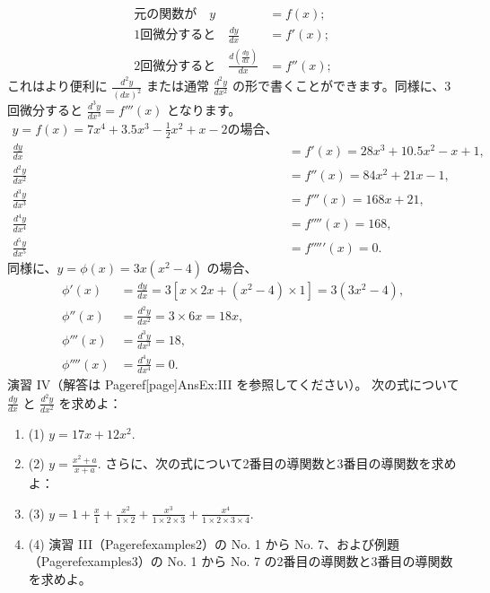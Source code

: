 \documentclass[a4paper,11pt,openany]{ltjsbook}
\begin{document}
\begin{align*}
\text{元の関数が} \quad y &= f(x);  \\
\text{1回微分すると} \quad \frac{dy}{dx} &= f'(x); \\
\text{2回微分すると} \quad \frac{d\left(\frac{dy}{dx}\right)}{dx} &= f''(x);
\end{align*}
これはより便利に $\frac{d^2y}{(dx)^2}$ または通常 $\frac{d^2y}{dx^2}$ の形で書くことができます。同様に、3回微分すると $\frac{d^3y}{dx^3} = f'''(x)$ となります。
\begin{align*}
y = f(x) = 7x^4 + 3.5x^3 - \frac{1}{2}x^2 + x - 2 の場合、 \\
\frac{dy}{dx} &= f'(x) = 28x^3 + 10.5x^2 - x + 1, \\
\frac{d^2y}{dx^2} &= f''(x) = 84x^2 + 21x - 1, \\
\frac{d^3y}{dx^3} &= f'''(x) = 168x + 21, \\
\frac{d^4y}{dx^4} &= f''''(x) = 168, \\
\frac{d^5y}{dx^5} &= f'''''(x) = 0.
\end{align*}
同様に、$y = \phi(x) = 3x(x^2 - 4)$ の場合、
\begin{align*}
\phi'(x) &= \frac{dy}{dx} = 3[x \times  2x + (x^2 - 4) \times  1] = 3(3x^2 - 4), \\
\phi''(x) &= \frac{d^2y}{dx^2} = 3 \times  6x = 18x, \\
\phi'''(x) &= \frac{d^3y}{dx^3} = 18, \\
\phi''''(x) &= \frac{d^4y}{dx^4} = 0.
\end{align*}
演習 IV（解答は Pageref[page]{AnsEx:III} を参照してください）。
次の式について $\frac{dy}{dx}$ と $\frac{d^2y}{dx^2}$ を求めよ：
\begin{enumerate}
\item (1) $y = 17x + 12x^2$.
\item (2) $y = \frac{x^2 + a}{x + a}$.
さらに、次の式について2番目の導関数と3番目の導関数を求めよ：
\item (3) $y = 1 + \frac{x}{1} + \frac{x^2}{1\times 2} + \frac{x^3}{1\times 2\times 3} + \frac{x^4}{1\times 2\times 3\times 4}$.
\item (4) 演習 III（Pageref{examples2}）の No. 1 から No. 7、および例題（Pageref{examples3}）の No. 1 から No. 7 の2番目の導関数と3番目の導関数を求めよ。
\end{enumerate}
\end{document}
